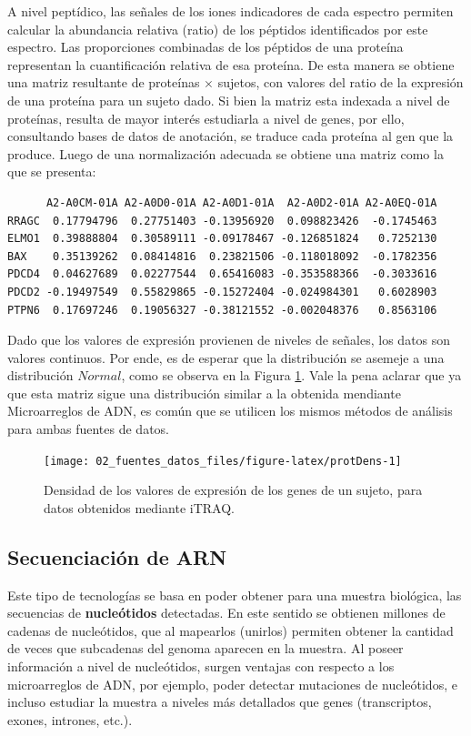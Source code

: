 \documentclass[12pt,twoside]{reedthesis}
\begin{document}
A nivel peptídico, las señales de los iones indicadores de cada espectro permiten calcular la abundancia relativa (ratio) de los péptidos identificados por este espectro. Las proporciones combinadas de los péptidos de una proteína representan la cuantificación relativa de esa proteína. De esta manera se obtiene una matriz resultante de proteínas \(\times\) sujetos, con valores del ratio de la expresión de una proteína para un sujeto dado. Si bien la matriz esta indexada a nivel de proteínas, resulta de mayor interés estudiarla a nivel de genes, por ello, consultando bases de datos de anotación, se traduce cada proteína al gen que la produce. Luego de una normalización adecuada se obtiene una matriz como la que se presenta:
\begin{verbatim}
      A2-A0CM-01A A2-A0D0-01A A2-A0D1-01A  A2-A0D2-01A A2-A0EQ-01A
RRAGC  0.17794796  0.27751403 -0.13956920  0.098823426  -0.1745463
ELMO1  0.39888804  0.30589111 -0.09178467 -0.126851824   0.7252130
BAX    0.35139262  0.08414816  0.23821506 -0.118018092  -0.1782356
PDCD4  0.04627689  0.02277544  0.65416083 -0.353588366  -0.3033616
PDCD2 -0.19497549  0.55829865 -0.15272404 -0.024984301   0.6028903
PTPN6  0.17697246  0.19056327 -0.38121552 -0.002048376   0.8563106
\end{verbatim}
Dado que los valores de expresión provienen de niveles de señales, los datos son valores continuos. Por ende, es de esperar que la distribución se asemeje a una distribución \(Normal\), como se observa en la Figura \ref{fig:protDens}. Vale la pena aclarar que ya que esta matriz sigue una distribución similar a la obtenida mendiante Microarreglos de ADN, es común que se utilicen los mismos métodos de análisis para ambas fuentes de datos.
\begin{figure}

{\centering \texttt{[image: 02\_fuentes\_datos\_files/figure-latex/protDens-1]} 

}

\caption{Densidad de los valores de expresión de los genes de un sujeto, para datos obtenidos mediante iTRAQ.}\label{fig:protDens}
\end{figure}
\hypertarget{secuenciaciuxf3n-de-arn}{%
\subsection{Secuenciación de ARN}\label{secuenciaciuxf3n-de-arn}}

Este tipo de tecnologías se basa en poder obtener para una muestra biológica, las secuencias de \textbf{nucleótidos} detectadas. En este sentido se obtienen millones de cadenas de nucleótidos, que al mapearlos (unirlos) permiten obtener la cantidad de veces que subcadenas del genoma aparecen en la muestra. Al poseer información a nivel de nucleótidos, surgen ventajas con respecto a los microarreglos de ADN, por ejemplo, poder detectar mutaciones de nucleótidos, e incluso estudiar la muestra a niveles más detallados que genes (transcriptos, exones, intrones, etc.).
\end{document}
